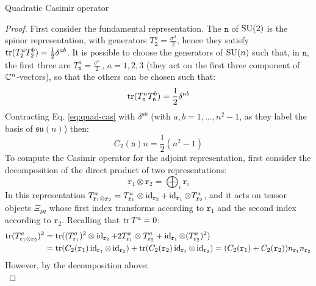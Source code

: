 \begin{proposition}{Quadratic Casimir operator}{}
  \begin{proof}
    First consider the fundamental representation. The $ \mathtt{n} $ of $ \mathrm{SU}(2) $ is the spinor representation, with generators $ T^a_\mathtt{2} = \frac{\sigma^a}{2} $, hence they satisfy $ \operatorname{tr}(T^a_\mathtt{2} T^b_\mathtt{2}) = \frac{1}{2} \delta^{ab} $. It is possible to choose the generators of $ \mathrm{SU}(n) $ such that, in $ \mathtt{n} $, the first three are $ T^a_\mathtt{n} = \frac{\sigma^a}{2} \,,\, a = 1,2,3 $ (they act on the first three component of $ \mathbb{C}^n $-vectors), so that the others can be chosen such that:
    \begin{equation*}
      \operatorname{tr} (T^a_\mathtt{n} T^b_\mathtt{n}) = \frac{1}{2} \delta^{ab}
    \end{equation*}
    Contracting Eq. \ref{eq:quad-cas} with $ \delta^{ab} $ (with $ a,b = 1,\dots, n^2 - 1 $, as they label the basis of $ \mathfrak{su}(n) $) then:
    \begin{equation*}
      C_2(\mathtt{n}) n = \frac{1}{2} (n^2 - 1)
    \end{equation*}
    To compute the Casimir operator for the adjoint representation, first consider the decomposition of the direct product of two representations:
    \begin{equation*}
      \mathtt{r}_1 \otimes \mathtt{r}_2 = \bigoplus_i \mathtt{r}_i
    \end{equation*}
    In this representation $ T^a_{\mathtt{r}_1 \otimes \mathtt{r}_2} = T^a_{\mathtt{r}_1} \otimes \operatorname{id}_{\mathtt{r}_2} + \operatorname{id}_{\mathtt{r}_1} \otimes T^a_{\mathtt{r}_2} $, and it acts on tensor objects $ \Xi_{pq} $ whose first index transforms according to $ \mathtt{r}_1 $ and the second index according to $ \mathtt{r}_2 $. Recalling that $ \operatorname{tr}{T^a} = 0 $:
    \begin{equation*}
      \begin{split}
        \operatorname{tr} (T^a_{\mathtt{r}_1 \otimes \mathtt{r}_2})^2
        &= \operatorname{tr} ((T^a_{\mathtt{r}_1})^2 \otimes \operatorname{id}_{\mathtt{r}_2} + 2 T^a_{\mathtt{r}_1} \otimes T^a_{\mathtt{r}_2} + \operatorname{id}_{\mathtt{r}_1} \otimes (T^a_{\mathtt{r}_2})^2) \\
        &= \operatorname{tr} (C_2(\mathtt{r}_1) \operatorname{id}_{\mathtt{r}_1} \otimes \operatorname{id}_{\mathtt{r}_2}) + \operatorname{tr} (C_2(\mathtt{r}_2) \operatorname{id}_{\mathtt{r}_1} \otimes \operatorname{id}_{\mathtt{r}_2}) = (C_2(\mathtt{r}_1) + C_2(\mathtt{r}_2)) n_{\mathtt{r}_1} n_{\mathtt{r}_2}
      \end{split}
    \end{equation*}
    However, by the decomposition above:
    \begin{equation*}

\end{equation*}
\end{proof}
\end{proposition}
